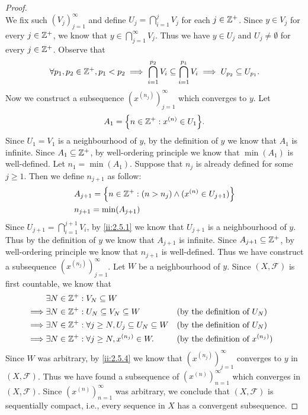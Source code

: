 \begin{proof}
\[  \]
  We fix such \((V_j)_{j = 1}^\infty\) and define \(U_j = \bigcap_{i = 1}^j V_j\) for each \(j \in \mathbb{Z}^+\).
  Since \(y \in V_j\) for every \(j \in \mathbb{Z}^+\), we know that \(y \in \bigcap_{j = 1}^\infty V_j\).
  Thus we have \(y \in U_j\) and \(U_j \neq \emptyset\) for every \(j \in \mathbb{Z}^+\).
  Observe that
  \[
    \forall p_1, p_2 \in \mathbb{Z}^+, p_1 < p_2 \implies \bigcap_{i = 1}^{p_2} V_i \subseteq \bigcap_{i = 1}^{p_1} V_i \implies U_{p_2} \subseteq U_{p_1}.
  \]
  Now we construct a subsequence \((x^{(n_j)})_{j = 1}^\infty\) which converges to \(y\).
  Let
  \[
    A_1 = \set{n \in \Z^+ : x^{(n)} \in U_1}.
  \]
  Since \(U_1 = V_1\) is a neighbourhood of \(y\), by the definition of \(y\) we know that \(A_1\) is infinite.
  Since \(A_1 \subseteq \mathbb{Z}^+\), by well-ordering principle we know that \(\min(A_1)\) is well-defined.
  Let \(n_1 = \min(A_1)\).
  Suppose that \(n_j\) is already defined for some \(j \geq 1\).
  Then we define \(n_{j + 1}\) as follow:
  \begin{align*}
     & A_{j + 1} = \left\lbrace n \in \mathbb{Z}^+ : (n > n_j) \land (x^{(n)} \in U_{j + 1})\right\rbrace \\
     & n_{j + 1} = \min(A_{j + 1})
  \end{align*}
  Since \(U_{j + 1} = \bigcap_{i = 1}^{j + 1} V_i\), by \cref{ii:2.5.1} we know that \(U_{j + 1}\) is a neighbourhood of \(y\).
  Thus by the definition of \(y\) we know that \(A_{j + 1}\) is infinite.
  Since \(A_{j + 1} \subseteq \mathbb{Z}^+\), by well-ordering principle we know that \(n_{j + 1}\) is well-defined.
  Thus we have construct a subsequence \((x^{(n_j)})_{j = 1}^\infty\).
  Let \(W\) be a neighbourhood of \(y\).
  Since \((X, \mathcal{F})\) is first countable, we know that
  \begin{align*}
             & \exists N \in \mathbb{Z}^+ : V_N \subseteq W                                                                                  \\
    \implies & \exists N \in \mathbb{Z}^+ : U_N \subseteq V_N \subseteq W                   &  & \text{(by the definition of \(U_N\))}       \\
    \implies & \exists N \in \mathbb{Z}^+ : \forall j \geq N, U_j \subseteq U_N \subseteq W &  & \text{(by the definition of \(U_N\))}       \\
    \implies & \exists N \in \mathbb{Z}^+ : \forall j \geq N, x^{(n_j)} \in W.              &  & \text{(by the definition of \(x^{(n_j)}\))}
  \end{align*}
  Since \(W\) was arbitrary, by \cref{ii:2.5.4} we know that \((x^{(n_j)})_{j = 1}^\infty\) converges to \(y\) in \((X, \mathcal{F})\).
  Thus we have found a subsequence of \((x^{(n)})_{n = 1}^\infty\) which converges in \((X, \mathcal{F})\).
  Since \((x^{(n)})_{n = 1}^\infty\) was arbitrary, we conclude that \((X, \mathcal{F})\) is sequentially compact, i.e., every sequence in \(X\) has a convergent subsequence.
\end{proof}

